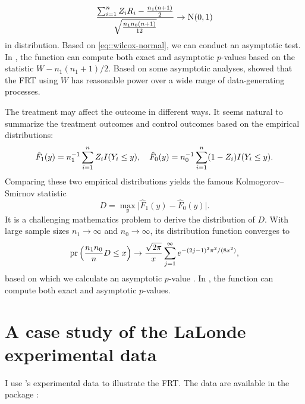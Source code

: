 \begin{example}
\begin{eqnarray}
\label{eq::wilcox-normal}
\frac{  \sumn Z_i R_i - \frac{n_1(n+1)}{2}   }{  \sqrt{  \frac{n_1 n_0 (n+1)}{12}   }}   \rightarrow \N01 
\end{eqnarray}
in distribution. 
Based on \eqref{eq::wilcox-normal}, we can conduct an asymptotic test. In , the function  can compute both exact and asymptotic $p$-values based on the statistic $W - n_1(n_1+1)/2$. Based on some asymptotic analyses, \citet{lehmann2006nonparametrics} showed that the FRT using $W$ has reasonable power over a wide range of data-generating processes.
\end{example}





\begin{example}
\label{eg::ks-CRE}
The treatment may affect the outcome in different ways. It seems natural to summarize the treatment outcomes and control outcomes based on the empirical distributions:
$$
\hat{F}_1( y) = n_1^{-1} \sum_{i=1}^n Z_i I(Y_i \leq y),\quad
\hat{F}_0( y ) = n_0^{-1} \sum_{i=1}^n (1-Z_i) I(Y_i \leq y) . 
$$ 
Comparing these two empirical distributions yields the famous Kolmogorov--Smirnov statistic
$$
D = \max_y  \Big |
\hat{F}_1( y) 
- \hat{F}_0( y ) 
\Big |.
$$
It is a challenging mathematics problem to derive the distribution of $D$. With large sample sizes $n_1\rightarrow \infty$ and $n_0\rightarrow \infty$, its distribution function converges to
$$
\textup{pr}\left(  \frac{n_1 n_0}{n}  D \leq  x   \right  ) \rightarrow   \frac{\sqrt{2\pi}}{x}   \sum_{j=1}^\infty  e^{     - (2j-1)^2 \pi^2 / (8x^2) }     ,
$$
based on which we calculate an asymptotic $p$-value \citep{van2000asymptotic}. In , the function  can compute both exact and asymptotic $p$-values.
\end{example}







\section{A case study of the LaLonde experimental data}
\label{sec::frt-lalonde-experiment}

I use \citet{lalonde1986evaluating}'s experimental data to illustrate the FRT. The data are available in the  package \citep{sekhon2011multivariate}: 

